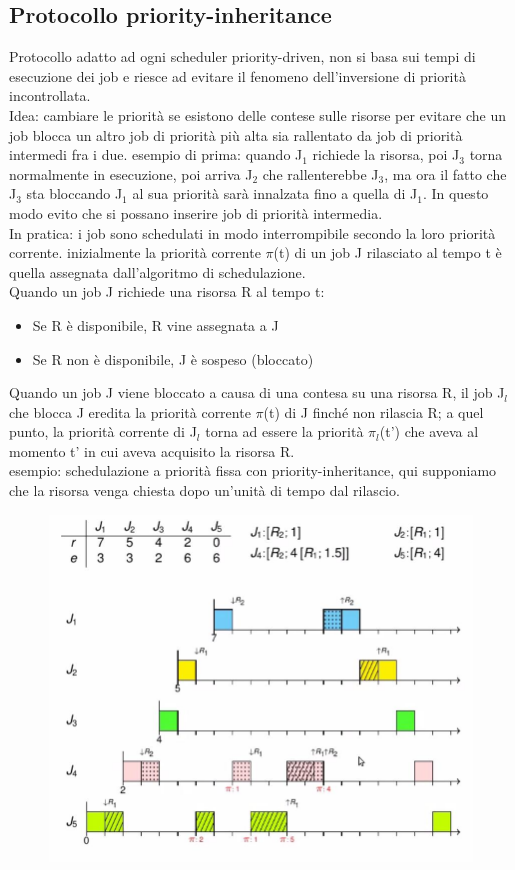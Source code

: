 \documentclass[12pt, oneside]{extbook}
\begin{document}
\subsection{Protocollo priority-inheritance}
Protocollo adatto ad ogni scheduler priority-driven, non si basa sui tempi di esecuzione dei job e riesce ad evitare il fenomeno dell'inversione di priorità incontrollata.\\ Idea: cambiare le priorità se esistono delle contese sulle risorse per evitare che un job blocca un altro job di priorità più alta sia rallentato da job di priorità intermedi fra i due. esempio di prima: quando J$_{1}$ richiede la risorsa, poi J$_{3}$ torna normalmente in esecuzione, poi arriva J$_{2}$ che rallenterebbe J$_{3}$, ma ora il fatto che J$_{3}$ sta bloccando J$_{1}$ al sua priorità sarà innalzata fino a quella di J$_{1}$. In questo modo evito che si possano inserire job di priorità intermedia.\\ In pratica: i job sono schedulati in modo interrompibile secondo la loro priorità corrente. inizialmente la priorità corrente $\pi$(t) di un job J rilasciato al tempo t è quella assegnata dall'algoritmo di schedulazione.\\ Quando un job J richiede una risorsa R al tempo t:
\begin{itemize}
\item Se R è disponibile, R vine assegnata a J
\item Se R non è disponibile, J è sospeso (bloccato)
\end{itemize}
Quando un job J viene bloccato a causa di una contesa su una risorsa R, il job J$_{l}$ che blocca J eredita la priorità corrente $\pi$(t)  di J finché non rilascia R; a quel punto, la priorità corrente di J$_{l}$ torna ad essere la priorità $\pi_{l}$(t') che aveva al momento t' in cui aveva acquisito la risorsa R.\\ esempio: schedulazione a priorità fissa con priority-inheritance, qui supponiamo che la risorsa venga chiesta dopo un'unità di tempo dal rilascio.\\
\begin{figure}[!h]
\centering
\includegraphics[scale=0.4]{immagini/image-023.jpg}
\end{figure}
\end{document}

